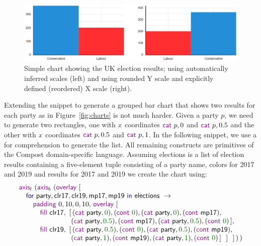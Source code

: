 \documentclass{jfp}
\newcommand{\X}{\emph{x}\ }
\newcommand{\num}[1]{\textcolor{numclr}{#1}}
\newcommand{\ident}[1]{\textnormal{\textcolor{idclr}{\sffamily #1}}}
\newcommand{\kvd}[1]{\textnormal{\textcolor{kvdclr}{\sffamily #1}}}
\newcommand{\fkvd}[1]{\textnormal{\textcolor{fkvdclr}{\sffamily #1}}}
\begin{document}
\begin{figure}
  \includegraphics[scale=0.57]{figures/simple}
  \vspace{0.25em}
  \caption{Simple chart showing the UK election results; using automatically inferred scales (left)
    and using rounded Y scale and explicitly defined (reordered) X scale (right).}
  \label{fig:simple}
\end{figure}

Extending the snippet to generate a grouped bar chart that shows two results
for each party as in Figure~\ref{fig:charts} is not much harder. Given a party $p$, we need to
generate two rectangles, one with \X coordinates $\kvd{cat}~p, 0$ and $\kvd{cat}~p, 0.5$
and the other with \X coordinates $\kvd{cat}~p, 0.5$ and $\kvd{cat}~p, 1$.
In the following snippet, we use a \fkvd{for} comprehension to generate the list. All remaining
constructs are primitives of the Compost domain-specific language. Assuming \ident{elections} is a
list of election results containing a five-element tuple consisting of a party name, colors for
2017 and 2019 and results for 2017 and 2019 we create the chart using:
%
\begin{equation*}
\begin{array}{l}
  \kvd{axis}_l~(\kvd{axis}_b~(\kvd{overlay}~[\\
  \quad \fkvd{for}~\ident{party}, \ident{clr17}, \ident{clr19}, \ident{mp17}, \ident{mp19}~\fkvd{in}~\ident{elections}~\rightarrow\\
  \quad\quad \kvd{padding}~0,10,0,10,\,\kvd{overlay}~[\\
  \quad\quad\quad \kvd{fill}~\ident{clr17},~[\,(\kvd{cat}~\ident{party}, \num{0}), (\kvd{cont}~\num{0}), (\kvd{cat}~\ident{party}, \num{0}), (\kvd{cont}~\ident{mp17}),\\
  \quad\quad\quad \hspace{4.08em}           ~(\kvd{cat}~\ident{party}, \num{0.5}), (\kvd{cont}~\ident{mp17}), (\kvd{cat}~\ident{party}, \num{0.5}), (\kvd{cont}~\num{0}) \,], \\
  \quad\quad\quad \kvd{fill}~\ident{clr19},~[\,(\kvd{cat}~\ident{party}, \num{0.5}), (\kvd{cont}~\num{0}), (\kvd{cat}~\ident{party}, \num{0.5}), (\kvd{cont}~\ident{mp19}),\\
  \quad\quad\quad \hspace{4.08em}           ~(\kvd{cat}~\ident{party}, \num{1}), (\kvd{cont}~\ident{mp19}), (\kvd{cat}~\ident{party}, \num{1}), (\kvd{cont}~\num{0})\,]~~]~~]\,)\,)\\
\end{array}
\end{equation*}
\end{document}
